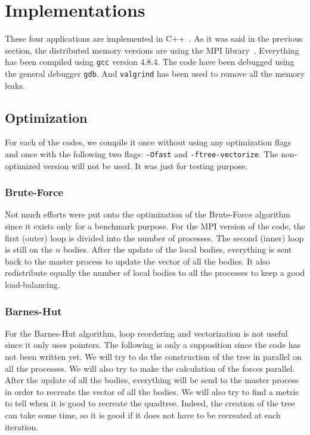 \documentclass[11pt,a4paper]{article}
\begin{document}
\section{Implementations}

These four applications are implemented in C++~\cite{c++}. As it was said in the previous section, the distributed memory versions are using the MPI library~\cite{mpi}. Everything has been compiled using \verb+gcc+ version 4.8.4. The code have been debugged using the general debugger \verb+gdb+. And \verb+valgrind+ has been used to remove all the memory leaks. 

\subsection{Optimization}

For each of the codes, we compile it once without using any optimization flags and once with the following two flags: \verb+-Ofast+ and \verb+-ftree-vectorize+. The non-optimized version will not be used. It was just for testing purpose.

\subsubsection{Brute-Force}

Not much efforts were put onto the optimization of the Brute-Force algorithm since it exists only for a benchmark purpose. For the MPI version of the code, the first (outer) loop is divided into the number of processes. The second (inner) loop is still on the $n$ bodies. After the update of the local bodies, everything is sent back to the master process to update the vector of all the bodies. It also redistribute equally the number of local bodies to all the processes to keep a good load-balancing.

\subsubsection{Barnes-Hut}

For the Barnes-Hut algorithm, loop reordering and vectorization is not useful since it only uses pointers. The following is only a supposition since the code has not been written yet. We will try to do the construction of the tree in parallel on all the processes. We will also try to make the calculation of the forces parallel. After the update of all the bodies, everything will be send to the master process in order to recreate the vector of all the bodies. We will also try to find a metric to tell when it is good to recreate the quadtree. Indeed, the creation of the tree can take some time, so it is good if it does not have to be recreated at each iteration.
\end{document}
